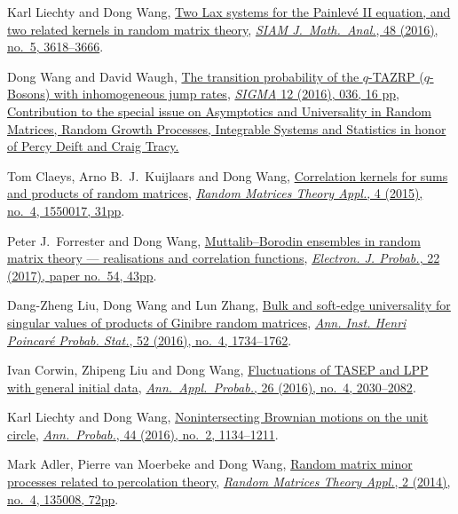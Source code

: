\documentclass[12pt,a4paper]{article}
\begin{document}
\begin{etaremune}
\item
  Karl Liechty and Dong Wang, \href{http://arxiv.org/abs/1601.01603}{Two Lax systems for the Painlev\'{e} II equation, and two related kernels in random matrix theory}, \href{https://doi.org/10.1137/16M1056080}{\textit{SIAM J.\ Math.\ Anal.}, 48 (2016), no.\ 5, 3618--3666}.
\item
  Dong Wang and David Waugh, \href{http://arxiv.org/abs/1512.01612}{The transition probability of the $q$-TAZRP ($q$-Bosons) with inhomogeneous jump rates}, \href{https://doi.org/10.3842/SIGMA.2016.037}{\textit{SIGMA} 12 (2016), 036, 16 pp, Contribution to the special issue on Asymptotics and Universality in Random Matrices, Random Growth Processes, Integrable Systems and Statistics in honor of Percy Deift and Craig Tracy.}
\item 
  Tom Claeys, Arno B.~J.~Kuijlaars and Dong Wang, \href{http://arxiv.org/abs/1505.00610}{Correlation kernels for sums and products of random matrices}, \href{https://doi.org/10.1142/S2010326315500173}{\textit{Random Matrices Theory Appl.}, 4 (2015), no.\ 4, 1550017, 31pp}.
\item
  Peter J.~Forrester and Dong Wang, \href{http://arxiv.org/abs/1502.07147}{Muttalib--Borodin ensembles in random matrix theory --- realisations and correlation functions}, \href{https://doi.org/10.1214/17-EJP62}{\textit{Electron. J. Probab.}, 22 (2017), paper no.\ 54, 43pp}.
\item
  Dang-Zheng Liu, Dong Wang and Lun Zhang, \href{http://arxiv.org/abs/1412.6777}{Bulk and soft-edge universality for singular values of products of Ginibre random matrices}, \href{https://doi.org/10.1214/15-AIHP696}{\textit{Ann. Inst. Henri Poincar\'e Probab. Stat.}, 52 (2016), no.\ 4, 1734--1762}.
\item
  Ivan Corwin, Zhipeng Liu and Dong Wang, \href{http://arxiv.org/abs/1412.5087}{Fluctuations of TASEP and LPP with general initial data}, \href{https://doi.org/10.1214/15-AAP1139}{\textit{Ann.\ Appl.\ Probab.}, 26 (2016), no.\ 4, 2030--2082}.
\item
  Karl Liechty and Dong Wang, \href{http://arxiv.org/abs/1312.7390}{Nonintersecting Brownian motions on the unit circle}, \href{https://doi.org/10.1214/14-AOP998}{\textit{Ann.\ Probab.}, 44 (2016), no.\ 2, 1134--1211}.
\item 
  Mark Adler, Pierre van Moerbeke and Dong Wang,
  \href{http://arxiv.org/abs/1301.7017}{Random matrix minor processes related to percolation theory}, \href{https://doi.org/10.1142/S2010326313500081}{\textit{Random Matrices Theory Appl.}, 2 (2014), no.\ 4, 135008, 72pp}.

\end{etaremune}
\end{document}
